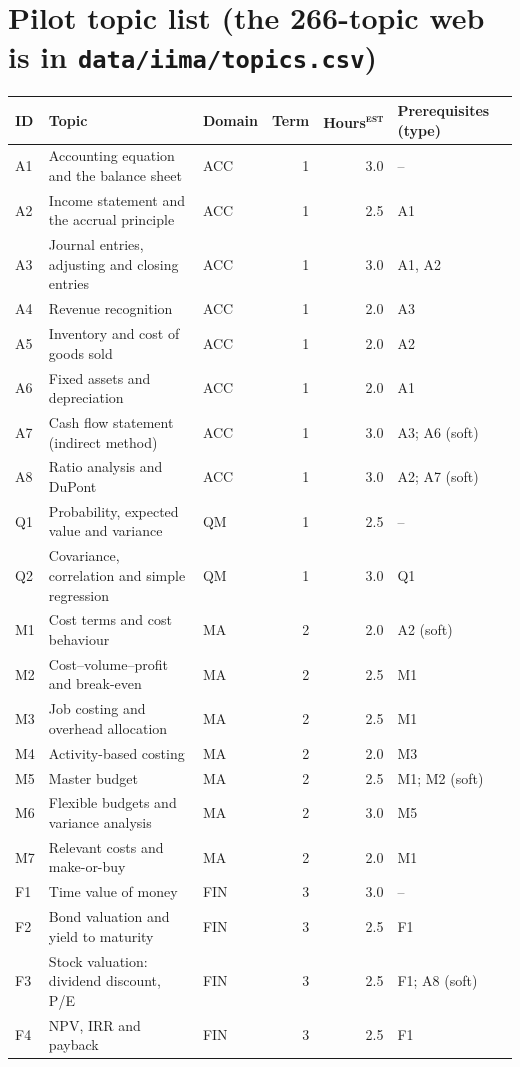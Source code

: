 \documentclass[11pt,a4paper]{article}
\newcommand{\est}{\textsuperscript{\textsc{est}}}
\begin{document}
\section{Pilot topic list (the 266-topic web is in \texttt{data/iima/topics.csv})}
\label{app:topics}
{\small
\begin{longtable}{@{}lp{6.3cm}lrrp{3.3cm}@{}}
\toprule
ID & Topic & Domain & Term & Hours\est & Prerequisites (type)\\
\midrule\endhead
A1 & Accounting equation and the balance sheet & ACC & 1 & 3.0 & --\\
A2 & Income statement and the accrual principle & ACC & 1 & 2.5 & A1\\
A3 & Journal entries, adjusting and closing entries & ACC & 1 & 3.0 & A1, A2\\
A4 & Revenue recognition & ACC & 1 & 2.0 & A3\\
A5 & Inventory and cost of goods sold & ACC & 1 & 2.0 & A2\\
A6 & Fixed assets and depreciation & ACC & 1 & 2.0 & A1\\
A7 & Cash flow statement (indirect method) & ACC & 1 & 3.0 & A3; A6 (soft)\\
A8 & Ratio analysis and DuPont & ACC & 1 & 3.0 & A2; A7 (soft)\\
Q1 & Probability, expected value and variance & QM & 1 & 2.5 & --\\
Q2 & Covariance, correlation and simple regression & QM & 1 & 3.0 & Q1\\
M1 & Cost terms and cost behaviour & MA & 2 & 2.0 & A2 (soft)\\
M2 & Cost--volume--profit and break-even & MA & 2 & 2.5 & M1\\
M3 & Job costing and overhead allocation & MA & 2 & 2.5 & M1\\
M4 & Activity-based costing & MA & 2 & 2.0 & M3\\
M5 & Master budget & MA & 2 & 2.5 & M1; M2 (soft)\\
M6 & Flexible budgets and variance analysis & MA & 2 & 3.0 & M5\\
M7 & Relevant costs and make-or-buy & MA & 2 & 2.0 & M1\\
F1 & Time value of money & FIN & 3 & 3.0 & --\\
F2 & Bond valuation and yield to maturity & FIN & 3 & 2.5 & F1\\
F3 & Stock valuation: dividend discount, P/E & FIN & 3 & 2.5 & F1; A8 (soft)\\
F4 & NPV, IRR and payback & FIN & 3 & 2.5 & F1\\

\end{longtable}}
\end{document}
